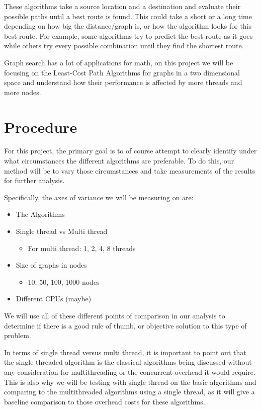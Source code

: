 \documentclass{article}
\begin{document}
These algorithms take a source location and a destination and evaluate their possible paths until a best route is found. This could take a short or a long time depending on how big the distance/graph is, or how the algorithm looks for this best route. For example, some algorithms try to predict the best route as it goes while others try every possible combination until they find the shortest route.

Graph search has a lot of applications for math, on this project we will be focusing on the Least-Cost Path Algorithms for graphs in a two dimensional space and understand how their performance is affected by more threads and more nodes.
\section{Procedure}
For this project, the primary goal is to of course attempt to clearly identify under what circumstances the different algorithms are preferable. To do this, our method will be to vary those circumstances and take measurements of the results for further analysis.

Specifically, the axes of variance we will be measuring on are:
\begin{itemize}
    \item The Algorithms
    \item Single thread vs Multi thread
    \begin{itemize}
        \item For multi thread: 1, 2, 4, 8 threads
    \end{itemize}
    \item Size of graphs in nodes
    \begin{itemize}
        \item 10, 50, 100, 1000 nodes
    \end{itemize}
    \item Different CPUs (maybe)
\end{itemize}
We will use all of these different points of comparison in our analysis to determine if there is a good rule of thumb, or objective solution to this type of problem.

In terms of single thread versus multi thread, it is important to point out that the single threaded algorithm is the classical algorithms being discussed without any consideration for multithreading or the concurrent overhead it would require. This is also why we will be testing with single thread on the basic algorithms and comparing to the multithreaded algorithms using a single thread, as it will give a baseline comparison to those overhead costs for these algorithms.
\end{document}
